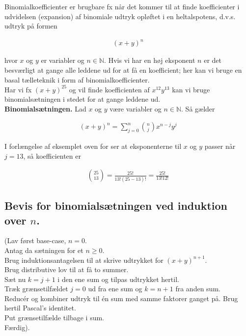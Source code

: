 \documentclass[12pt]{article}
\newcommand{\N}{\mathbb{N}}
\begin{document}
Binomialkoefficienter er brugbare fx når det kommer til at finde koefficienter i udvidelsen (expansion) af binomiale udtryk opløftet i en heltalspotens, d.v.s. udtryk på formen

\begin{align*}
    (x+y)^n
\end{align*}

hvor $x$ og $y$ er variabler og $n\in \N$. Hvis vi har en høj eksponent $n$ er det besværligt at gange alle leddene ud for at få en koefficient; her kan vi bruge en basal tælleteknik i form af binomialkoefficienter. \\

Har vi fx $(x+y)^{25}$ og vil finde koefficienten af $x^{12} y^{13}$ kan vi bruge binomialsætningen i stedet for at gange leddene ud.\\

\textbf{Binomialsætningen.} Lad $x$ og $y$ være variabler og $n\in \N$. Så gælder

\begin{align*}
    (x+y)^n = \sum_{j=0}^n \binom{n}{j}x^{n-j} y^j
\end{align*}

I forlængelse af eksemplet oven for ser at eksponenterne til $x$ og $y$ passer når $j=13$, så koefficienten er 

\begin{align*}
    \binom{25}{13} = \frac{25!}{13!(25-13)!} = \frac{25!}{13!12!}
\end{align*}

\subsection*{Bevis for binomialsætningen ved induktion over $n$.} 

(Lav først base-case, $n=0$. \\
Antag da sætningen for et $n \ge 0$. \\
Brug induktionsantagelsen til at skrive udtrykket for $(x+y)^{n+1}$. \\
Brug distributive lov til at få to summer. \\
Sæt nu $k=j+1$ i den ene sum og tilpas udtrykket hertil.\\ 
Træk grænsetilfældet $j=0$ ud fra ene sum og $k=n+1$ fra anden sum. \\
Reducér og kombiner udtryk til én sum med samme faktorer ganget på. Brug hertil Pascal's identitet.\\
Put grænsetilfælde tilbage i sum. \\
Færdig). \\ 
\end{document}
